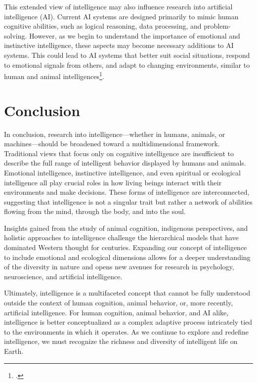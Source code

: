 \documentclass[12pt]{article}
\begin{document}
This extended view of intelligence may also influence research into artificial intelligence (AI). Current AI systems are designed primarily to mimic human cognitive abilities, such as logical reasoning, data processing, and problem-solving. However, as we begin to understand the importance of emotional and instinctive intelligence, these aspects may become necessary additions to AI systems. This could lead to AI systems that better suit social situations, respond to emotional signals from others, and adapt to changing environments, similar to human and animal intelligences\footcite{lovelock2000gaia}.

\newpage
\section{Conclusion}

In conclusion, research into intelligence—whether in humans, animals, or machines—should be broadened toward a multidimensional framework. Traditional views that focus only on cognitive intelligence are insufficient to describe the full range of intelligent behavior displayed by humans and animals. Emotional intelligence, instinctive intelligence, and even spiritual or ecological intelligence all play crucial roles in how living beings interact with their environments and make decisions. These forms of intelligence are interconnected, suggesting that intelligence is not a singular trait but rather a network of abilities flowing from the mind, through the body, and into the soul.

Insights gained from the study of animal cognition, indigenous perspectives, and holistic approaches to intelligence challenge the hierarchical models that have dominated Western thought for centuries. Expanding our concept of intelligence to include emotional and ecological dimensions allows for a deeper understanding of the diversity in nature and opens new avenues for research in psychology, neuroscience, and artificial intelligence.

Ultimately, intelligence is a multifaceted concept that cannot be fully understood outside the context of human cognition, animal behavior, or, more recently, artificial intelligence. For human cognition, animal behavior, and AI alike, intelligence is better conceptualized as a complex adaptive process intricately tied to the environments in which it operates. As we continue to explore and redefine intelligence, we must recognize the richness and diversity of intelligent life on Earth.

\newpage



\printbibliography
\end{document}
